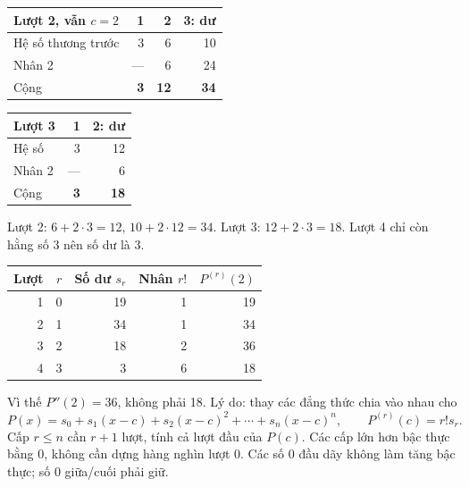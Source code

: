 \begin{center}\small
\begin{tabular}{@{}lrr|r@{}}\toprule
Lượt 2, vẫn $c=2$ & 1 & 2 & 3: dư\\\midrule
Hệ số thương trước & 3 & 6 & 10\\
Nhân 2 & --- & 6 & 24\\\midrule
Cộng & \textbf{3} & \textbf{12} & \textbf{34}\\\bottomrule
\end{tabular}\qquad
\begin{tabular}{@{}lr|r@{}}\toprule
Lượt 3 & 1 & 2: dư\\\midrule
Hệ số & 3 & 12\\
Nhân 2 & --- & 6\\\midrule
Cộng & \textbf{3} & \textbf{18}\\\bottomrule
\end{tabular}\end{center}
Lượt 2: $6+2\cdot3=12$, $10+2\cdot12=34$. Lượt 3: $12+2\cdot3=18$. Lượt 4 chỉ còn hằng số 3 nên số dư là 3.

\begin{center}\begin{tabular}{@{}rrrrr@{}}\toprule
Lượt & $r$ & Số dư $s_r$ & Nhân $r!$ & $P^{(r)}(2)$\\\midrule
1 & 0 & 19 & 1 & 19\\
2 & 1 & 34 & 1 & 34\\
3 & 2 & 18 & 2 & 36\\
4 & 3 & 3 & 6 & 18\\\bottomrule
\end{tabular}\end{center}
Vì thế $P''(2)=36$, không phải 18. Lý do: thay các đẳng thức chia vào nhau cho
\[
 P(x)=s_0+s_1(x-c)+s_2(x-c)^2+\cdots+s_n(x-c)^n,
 \qquad P^{(r)}(c)=r!s_r.
\]
Cấp $r\le n$ cần $r+1$ lượt, tính cả lượt đầu của $P(c)$. Các cấp lớn hơn bậc thực bằng 0, không cần dựng hàng nghìn lượt 0. Các số 0 đầu dãy không làm tăng bậc thực; số 0 giữa/cuối phải giữ.

